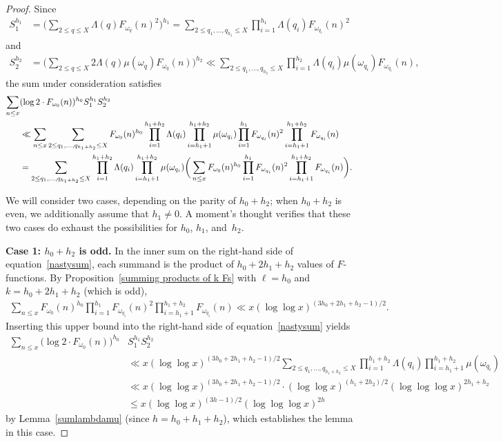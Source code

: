 \documentclass[12pt,reqno]{amsart}
\theoremstyle{definition}
\begin{document}
\begin{proof}
Since
\begin{align*}
S_1^{h_1} &= \bigg( \sum_{2\le q \leq X} \Lambda(q) F_{\omega_{q}}(n)^2 \bigg)^{h_1} = \sum_{2\le q_1, \ldots, q_{h_1} \leq X} \prod_{i = 1}^{h_1} \Lambda(q_i) F_{\omega_{q_i}}(n)^2
\end{align*}
and
\begin{align*}
S_2^{h_2} &= \bigg( \sum_{2\le q \leq X} 2 \Lambda(q)  \mu(\omega_{q}) F_{\omega_{q}}(n) \bigg)^{h_2} \ll \sum_{2\le q_1, \ldots, q_{h_2} \leq X} \prod_{i = 1}^{h_2}  \Lambda(q_i)  \mu(\omega_{q_i})F_{\omega_{q_i}}(n),
\end{align*}
the sum under consideration satisfies
\begin{align} \label{nastysum}
\sum_{n \leq x} & ( \log 2 \cdot F_{\omega_0}(n))^{h_0} S_1^{h_1}S_2^{h_2} \\
&\ll \sum_{n \leq x} \sum_{2\le q_1, \ldots, q_{h_1 + h_2} \leq X} F_{\omega_0}(n)^{h_0} \prod_{i = 1}^{h_1 + h_2} \Lambda(q_i) \prod_{i = h_1 + 1}^{h_1 + h_2} \mu(\omega_{q_i}) \prod_{i = 1}^{h_1} F_{\omega_{q_i}}(n)^2 \prod_{i = h_1 + 1}^{h_1 + h_2} F_{\omega_{q_i}}(n) \notag \\
&= \sum_{2\le q_1, \ldots, q_{h_1 + h_2} \leq X} \prod_{i = 1}^{h_1 + h_2} \Lambda(q_i) \prod_{i = h_1 + 1}^{h_1 + h_2} \mu(\omega_{q_i}) \bigg( \sum_{n \leq x} F_{\omega_0}(n)^{h_0} \prod_{i = 1}^{h_1} F_{\omega_{q_i}}(n)^2 \prod_{i = h_1 + 1}^{h_1 + h_2} F_{\omega_{q_i}}(n) \bigg).\notag
\end{align}

We will consider two cases, depending on the parity of $h_0+h_2$; when $h_0+h_2$ is even, we additionally assume that $h_1\ne0$. A moment's thought verifies that these two cases do exhaust the possibilities for $h_0$, $h_1$, and~$h_2$.

\medskip\noindent \textbf{Case 1: $h_0 + h_2$ is odd.}
In the inner sum on the right-hand side of equation~\eqref{nastysum},
each summand is the product of $h_0 + 2h_1 + h_2$ values of $F$-functions. By Proposition~\ref{summing products of k Fs} with $\ell=h_0$ and $k=h_0 + 2h_1 + h_2$ (which is odd),
\begin{align*}
\sum_{n \leq x} F_{\omega_0}(n)^{h_0} \prod_{i = 1}^{h_1} F_{\omega_{q_i}}(n)^2 \prod_{i = h_1 + 1}^{h_1 + h_2} F_{\omega_{q_i}}(n) \ll x (\log\log x)^{(3h_0 + 2h_1 + h_2 - 1)/2}.
\end{align*}
Inserting this upper bound into the right-hand side of equation~\eqref{nastysum} yields
\begin{align*}
\sum_{n \leq x} \big( \log 2 \cdot F_{\omega_0}(n) \big)^{h_0} & S_1^{h_1}S_2^{h_2} \\
&\ll x (\log\log x)^{(3h_0 + 2h_1 + h_2 - 1)/2} \sum_{2\le q_1, \ldots, q_{h_1 + h_2} \leq X} \prod_{i = 1}^{h_1 + h_2} \Lambda(q_i) \prod_{i = h_1 + 1}^{h_1 + h_2} \mu(\omega_{q_i}) \\
&\ll x (\log\log x)^{(3h_0 + 2h_1 + h_2 - 1)/2} \cdot (\log\log x)^{(h_1 + 2h_2)/2}(\log\log\log x)^{2h_1 + h_2} \\
&\le x (\log\log x)^{(3h - 1)/2} (\log\log\log x)^{2h}
\end{align*}
by Lemma~\ref{sumlambdamu} (since $h=h_0+h_1+h_2$), which establishes the lemma in this case.


\end{proof}
\end{document}
